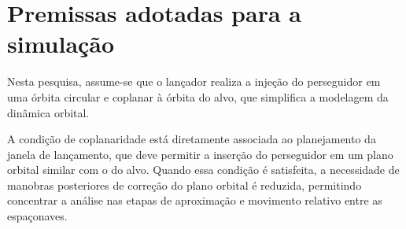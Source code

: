 \section{Premissas adotadas para a simulação}

Nesta pesquisa, assume-se que o lançador realiza a injeção do perseguidor em uma órbita circular e coplanar à órbita do alvo, que simplifica a modelagem da dinâmica orbital.

A condição de coplanaridade está diretamente associada ao planejamento da janela de lançamento, que deve permitir a inserção do perseguidor em um plano orbital similar com o do alvo. 
Quando essa condição é satisfeita, a necessidade de manobras posteriores de correção do plano orbital é reduzida, permitindo concentrar a análise nas etapas de aproximação e movimento relativo entre as espaçonaves.